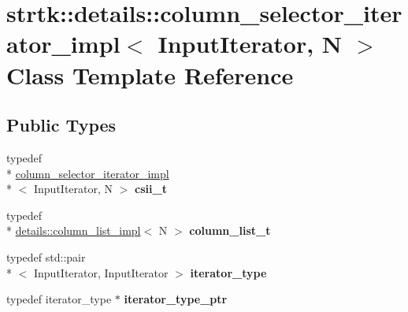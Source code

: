 \hypertarget{classstrtk_1_1details_1_1column__selector__iterator__impl}{\section{strtk\-:\-:details\-:\-:column\-\_\-selector\-\_\-iterator\-\_\-impl$<$ Input\-Iterator, N $>$ Class Template Reference}
\label{classstrtk_1_1details_1_1column__selector__iterator__impl}
}
\subsection*{Public Types}
\begin{DoxyCompactItemize}
\item 
\hypertarget{classstrtk_1_1details_1_1column__selector__iterator__impl_a8953537eafbd503e85d8de9e5aca7d78}{typedef \\*
\hyperlink{classstrtk_1_1details_1_1column__selector__iterator__impl}{column\-\_\-selector\-\_\-iterator\-\_\-impl}\\*
$<$ Input\-Iterator, N $>$ {\bfseries csii\-\_\-t}}\label{classstrtk_1_1details_1_1column__selector__iterator__impl_a8953537eafbd503e85d8de9e5aca7d78}

\item 
\hypertarget{classstrtk_1_1details_1_1column__selector__iterator__impl_a9bd3ac882814bdd99558a285d49f3b2c}{typedef \\*
\hyperlink{structstrtk_1_1details_1_1column__list__impl}{details\-::column\-\_\-list\-\_\-impl}$<$ N $>$ {\bfseries column\-\_\-list\-\_\-t}}\label{classstrtk_1_1details_1_1column__selector__iterator__impl_a9bd3ac882814bdd99558a285d49f3b2c}

\item 
\hypertarget{classstrtk_1_1details_1_1column__selector__iterator__impl_a4d8fec152843941b158e97f4a714c506}{typedef std\-::pair\\*
$<$ Input\-Iterator, Input\-Iterator $>$ {\bfseries iterator\-\_\-type}}\label{classstrtk_1_1details_1_1column__selector__iterator__impl_a4d8fec152843941b158e97f4a714c506}

\item 
\hypertarget{classstrtk_1_1details_1_1column__selector__iterator__impl_adc63fc56bdeb7537aa646a8ed0177b55}{typedef iterator\-\_\-type $\ast$ {\bfseries iterator\-\_\-type\-\_\-ptr}}\label{classstrtk_1_1details_1_1column__selector__iterator__impl_adc63fc56bdeb7537aa646a8ed0177b55}

\end{DoxyCompactItemize}
